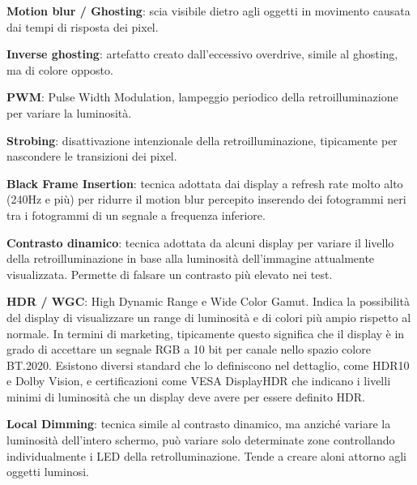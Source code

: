 \textbf{Motion blur / Ghosting}: scia visibile dietro agli oggetti in movimento causata dai tempi di risposta dei pixel.

\textbf{Inverse ghosting}: artefatto creato dall'eccessivo overdrive, simile al ghosting, ma di colore opposto.

\textbf{PWM}: Pulse Width Modulation, lampeggio periodico della retroilluminazione per variare la luminosità.

\textbf{Strobing}: disattivazione intenzionale della retroilluminazione, tipicamente per nascondere le transizioni dei pixel.

\textbf{Black Frame Insertion}: tecnica adottata dai display a refresh rate molto alto (240Hz e più) per ridurre il motion blur percepito inserendo dei fotogrammi neri tra i fotogrammi di un segnale a frequenza inferiore.

\textbf{Contrasto dinamico}: tecnica adottata da alcuni display per variare il livello della retroilluminazione in base alla luminosità dell'immagine attualmente visualizzata. Permette di falsare un contrasto più elevato nei test.

\textbf{HDR / WGC}: High Dynamic Range e Wide Color Gamut. Indica la possibilità del display di visualizzare un range di luminosità e di colori più ampio rispetto al normale. In termini di marketing, tipicamente questo significa che il display è in grado di accettare un segnale RGB a 10 bit per canale nello spazio colore BT.2020. Esistono diversi standard che lo definiscono nel dettaglio, come HDR10 e Dolby Vision, e certificazioni come VESA DisplayHDR che indicano i livelli minimi di luminosità che un display deve avere per essere definito HDR.

\textbf{Local Dimming}: tecnica simile al contrasto dinamico, ma anziché variare la luminosità dell'intero schermo, può variare solo determinate zone controllando individualmente i LED della retrolluminazione. Tende a creare aloni attorno agli oggetti luminosi.

